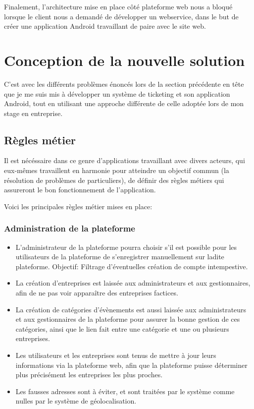 \documentclass[12pt,table,a4paper]{report}
\begin{document}
Finalement, l'architecture mise en place côté plateforme web nous a bloqué lorsque le client nous a demandé de développer un webservice, dans le but de créer une application Android travaillant de paire avec le site web.

\section{Conception de la nouvelle solution}
C'est avec les différents problèmes énoncés lors de la section précédente en tête que je me suis mis à développer un système de ticketing et son application Android, tout en utilisant une approche différente de celle adoptée lors de mon stage en entreprise.

\subsection{Règles métier}
Il est nécéssaire dans ce genre d'applications travaillant avec divers acteurs, qui eux-mêmes travaillent en harmonie pour atteindre un objectif commun (la résolution de problèmes de particuliers), de définir des règles métiers qui assureront le bon fonctionnement de l'application.

Voici les principales règles métier mises en place:

\subsubsection{Administration de la plateforme}
\begin{itemize}
	\item{L'administrateur de la plateforme pourra choisir s'il est possible pour les utilisateurs de la plateforme de s'enregistrer manuellement sur ladite plateforme. Objectif: Filtrage d'éventuelles création de compte intempestive.}
	\item{La création d'entreprises est laissée aux administrateurs et aux gestionnaires, afin de ne pas voir apparaître des entreprises factices.}
	\item{La création de catégories d'évènements est aussi laissée aux administrateurs et aux gestionnaires de la plateforme pour assurer la bonne gestion de ces catégories, ainsi que le lien fait entre une catégorie et une ou plusieurs entreprises.}
	\item{Les utilisateurs et les entreprises sont tenus de mettre à jour leurs informations via la plateforme web, afin que la plateforme puisse déterminer plus précisément les entreprises les plus proches.}
	\item{Les fausses adresses sont à éviter, et sont traitées par le système comme nulles par le système de géolocalisation.}
\end{itemize}
\end{document}
